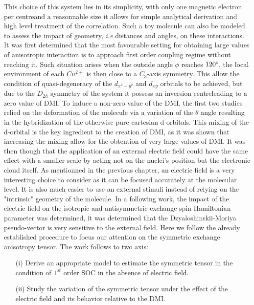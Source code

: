 \documentclass[10pt]{report}
\numberwithin{equation}{section}
\begin{document}
This choice of this system lies in its simplicity, with only one magnetic electron per centreand a reasonnable size it allows for simple analytical derivation and high level treatment of the correlation.
Such a toy molecule can also be modeled to assess the impact of geometry, \textit{i.e} distances and angles, on these interactions.
It was first determined that the most favourable setting for obtaining large values of anisotropic interaction is to approach first order coupling regime without reaching it.
Such situation arises when the outside angle $\phi$ reaches $120 \degree$, the local environment of each $Cu^{2+}$ is then close to a $C_3$-axis symmetry.
This allow the condition of quasi-degeneracy of the $d_{x^2-y^2}$ and $d_{xy}$ orbitals to be achieved, but due to the $D_{2h}$ symmetry of the system it possess an inversion centreleading to a zero value of DMI.
To induce a non-zero value of the DMI, the first two studies relied on the deformation of the molecule via a variation of the $\theta$ angle resulting in the hybridization of the otherwise pure cartesian d-orbitals.
This mixing of the d-orbital is the key ingredient to the creation of DMI, as it was shown that increasing the mixing allow for the obtention of very large values of DMI.
It was then though that the application of an external electric field could have the same effect with a smaller scale by acting not on the nuclei's position but the electronic cloud itself.
As mentionned in the previous chapter, an electric field is a very interesting choice to consider as it can be focused accurately at the molecular level. 
It is also much easier to use an external stimuli instead of relying on the "intrinsic" geometry of the molecule.
In a following work, the impact of the electric field on the isotropic and antisymmetric exchange spin Hamiltonian parameter was determined, it was determined that the Dzyaloshinskii-Moriya pseudo-vector is very sensitive to the external field.
Here we follow the already established procedure to focus our attention on the symmetric exchange anisotropy tensor.
The work follows to two axis:
\begin{itemize}
    \item[(i)] Derive an appropriate model to estimate the symmetric tensor in the condition of $1^{st}$ order SOC in the absence of electric field.
    \item[(ii)] Study the variation of the symmetric tensor under the effect of the electric field and its behavior relative to the DMI.
\end{itemize}
\end{document}
